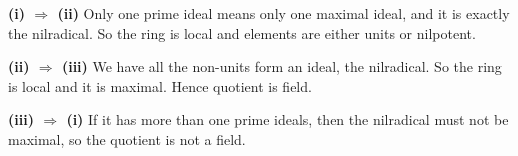 \textbf{(i) $\Rightarrow$ (ii)} Only one prime ideal means only one maximal ideal, and it is exactly the nilradical. So the ring is local and elements are either units or nilpotent.

\textbf{(ii) $\Rightarrow$ (iii)} We have all the non-units form an ideal, the nilradical. So the ring is local and it is maximal. Hence quotient is field.

\textbf{(iii) $\Rightarrow$ (i)} If it has more than one prime ideals, then the nilradical must not be maximal, so the quotient is not a field.
